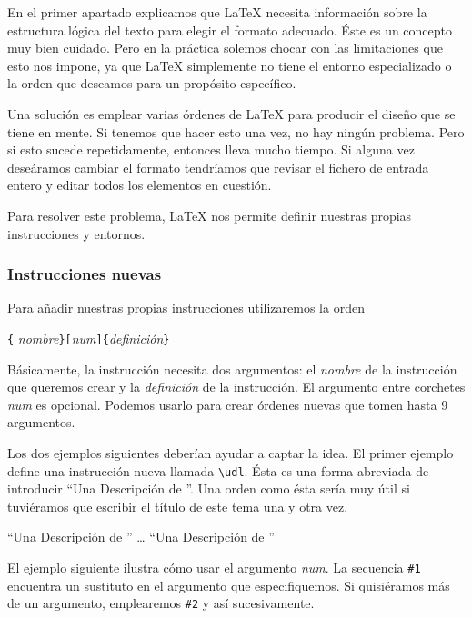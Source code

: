 En  el primer  apartado explicamos  que \LaTeX{}  necesita información
sobre la estructura lógica del  texto para elegir el formato adecuado.
Éste es  un concepto  muy bien  cuidado. Pero  en la  práctica solemos
chocar  con las  limitaciones que  esto  nos impone,  ya que  \LaTeX{}
simplemente no tiene el entorno  especializado o la orden que deseamos
para un propósito específico.

Una solución  es emplear varias  órdenes de \LaTeX{} para  producir el
diseño que se  tiene en mente. Si  tenemos que hacer esto  una vez, no
hay ningún problema. Pero si esto sucede repetidamente, entonces lleva
mucho tiempo. Si  alguna vez deseáramos cambiar  el formato tendríamos
que revisar el fichero de entrada  entero y editar todos los elementos
en cuestión.

Para  resolver este  problema, \LaTeX{}  nos permite  definir nuestras
propias instrucciones y entornos.

\subsubsection{Instrucciones nuevas}

Para añadir nuestras propias instrucciones utilizaremos la orden

\begin{command}
\verb|{|%
   \emph{nombre}\verb|}[|\emph{num}\verb|]{|\emph{definición}\verb|}|
\end{command}

\noindent  Básicamente,   la  instrucción  necesita   dos  argumentos:
el  \emph{nombre}   de  la  instrucción   que  queremos  crear   y  la
\emph{definición}  de la  instrucción.  El  argumento entre  corchetes
\emph{num} es opcional.  Podemos usarlo para crear  órdenes nuevas que
tomen hasta 9 argumentos.

Los  dos ejemplos  siguientes deberían  ayudar  a captar  la idea.  El
primer ejemplo define una  instrucción nueva llamada \verb|\udl|. Ésta
es una forma  abreviada de introducir ``Una  Descripción de \LaTeXe''.
Una  orden como  ésta sería  muy útil  si tuviéramos  que escribir  el
título de este tema una y otra vez.

\begin{example}
\newcommand{\udl}
    {Una Descripción de \LaTeXe}
``\udl'' \ldots{} ``\udl''
\end{example}

El ejemplo  siguiente ilustra  cómo usar  el argumento  \emph{num}. La
secuencia  \verb|#1|  encuentra  un  sustituto  en  el  argumento  que
especifiquemos.  Si  quisiéramos  más  de  un  argumento,  emplearemos
\verb|#2| y así sucesivamente.

